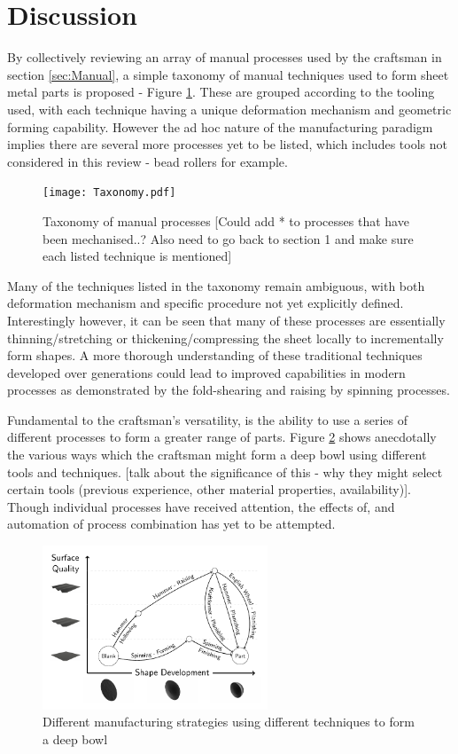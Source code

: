 \section{Discussion}

By collectively reviewing an array of manual processes used by the craftsman in section \ref{sec:Manual}, a simple taxonomy of manual techniques used to form sheet metal parts is proposed - Figure \ref{fig:ManualTaxonomy}. These are grouped according to the tooling used, with each technique having a unique deformation mechanism and geometric forming capability. However the ad hoc nature of the manufacturing paradigm implies there are several more processes yet to be listed, which includes tools not considered in this review - bead rollers for example.

\begin{figure}[h]
	\centering
    \texttt{[image: Taxonomy.pdf]}
    \caption{Taxonomy of manual processes [Could add * to processes that have been mechanised..? Also need to go back to section 1 and make sure each listed technique is mentioned]}
    \label{fig:ManualTaxonomy}
\end{figure}

Many of the techniques listed in the taxonomy remain ambiguous, with both deformation mechanism and specific procedure not yet explicitly defined. Interestingly however, it can be seen that many of these processes are essentially thinning/stretching or thickening/compressing the sheet locally to incrementally form shapes. A more thorough understanding of these traditional techniques developed over generations could lead to improved capabilities in modern processes as demonstrated by the fold-shearing and raising by spinning processes. 

Fundamental to the craftsman's versatility, is the ability to use a series of different processes to form a greater range of parts. Figure \ref{fig:ShapeDevBowl} shows anecdotally the various ways which the craftsman might form a deep bowl using different tools and techniques. [talk about the significance of this - why they might select certain tools (previous experience, other material properties, availability)]. Though individual processes have received attention, the effects of, and automation of process combination has yet to be attempted.

\begin{figure}[h]
    \centering
    \includegraphics[width=0.6\textwidth]{Images/Bowl.pdf}
    \caption{Different manufacturing strategies using different techniques to form a deep bowl}
    \label{fig:ShapeDevBowl}
\end{figure}


